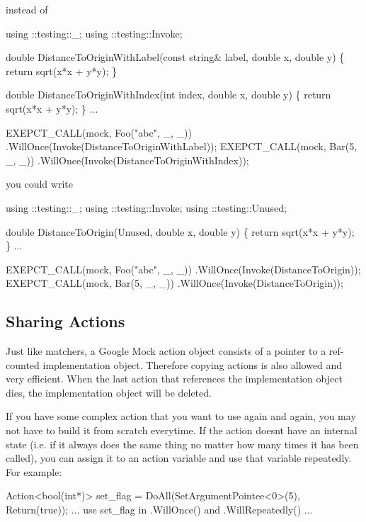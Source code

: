instead of


\begin{DoxyCode}
using ::testing::\_;
using ::testing::Invoke;

double DistanceToOriginWithLabel(const string& label, double x, double y) \{
  return sqrt(x*x + y*y);
\}

double DistanceToOriginWithIndex(int index, double x, double y) \{
  return sqrt(x*x + y*y);
\}
...

  EXEPCT\_CALL(mock, Foo("abc", \_, \_))
      .WillOnce(Invoke(DistanceToOriginWithLabel));
  EXEPCT\_CALL(mock, Bar(5, \_, \_))
      .WillOnce(Invoke(DistanceToOriginWithIndex));
\end{DoxyCode}


you could write


\begin{DoxyCode}
using ::testing::\_;
using ::testing::Invoke;
using ::testing::Unused;

double DistanceToOrigin(Unused, double x, double y) \{
  return sqrt(x*x + y*y);
\}
...

  EXEPCT\_CALL(mock, Foo("abc", \_, \_))
      .WillOnce(Invoke(DistanceToOrigin));
  EXEPCT\_CALL(mock, Bar(5, \_, \_))
      .WillOnce(Invoke(DistanceToOrigin));
\end{DoxyCode}


\subsection*{Sharing Actions}

Just like matchers, a Google Mock action object consists of a pointer to a ref-\/counted implementation object. Therefore copying actions is also allowed and very efficient. When the last action that references the implementation object dies, the implementation object will be deleted.

If you have some complex action that you want to use again and again, you may not have to build it from scratch everytime. If the action doesn\textquotesingle{}t have an internal state (i.\+e. if it always does the same thing no matter how many times it has been called), you can assign it to an action variable and use that variable repeatedly. For example\+:


\begin{DoxyCode}
Action<bool(int*)> set\_flag = DoAll(SetArgumentPointee<0>(5),
                                    Return(true));
... use set\_flag in .WillOnce() and .WillRepeatedly() ...
\end{DoxyCode}


